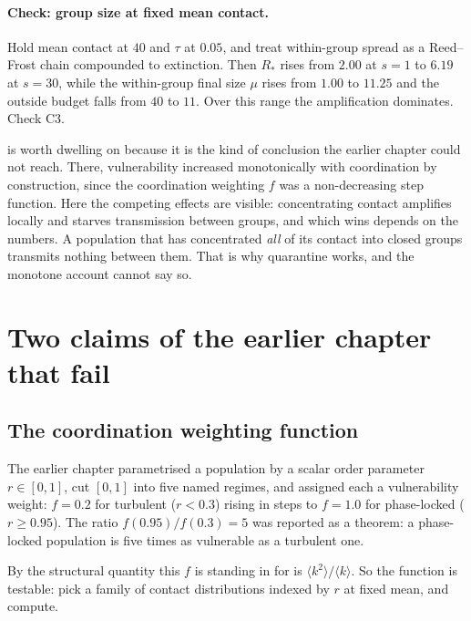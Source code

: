 \paragraph{Check: group size at fixed mean contact.} \lnkC{} Hold mean contact at
$40$ and $\tau$ at $0.05$, and treat within-group spread as a Reed--Frost
chain compounded to extinction. Then $R_*$ rises from $2.00$ at $s=1$ to
$6.19$ at $s=30$, while the within-group final size $\mu$ rises from $1.00$
to $11.25$ and the outside budget falls from $40$ to $11$. Over this range
the amplification dominates. Check C3.

 is worth dwelling on because it is the kind of
conclusion the earlier chapter could not reach. There, vulnerability
increased monotonically with coordination by construction, since the
coordination weighting $f$ was a non-decreasing step function. Here the
competing effects are visible: concentrating contact amplifies locally and
starves transmission between groups, and which wins depends on the numbers.
A population that has concentrated \emph{all} of its contact into closed
groups transmits nothing between them. That is why quarantine works, and the
monotone account cannot say so.

\section{Two claims of the earlier chapter that fail}
\label{sm:sec:failures}

\subsection{The coordination weighting function}
\label{sm:sec:weighting}

The earlier chapter parametrised a population by a scalar order parameter
$r\in[0,1]$, cut $[0,1]$ into five named regimes, and assigned each a
vulnerability weight: $f=0.2$ for turbulent ($r<0.3$) rising in steps to
$f=1.0$ for phase-locked ($r\ge0.95$). The ratio $f(0.95)/f(0.3)=5$ was
reported as a theorem: a phase-locked population is five times as vulnerable
as a turbulent one.

By  the structural quantity this $f$ is standing in for is
$\langle k^2\rangle/\langle k\rangle$. So the function is testable: pick a
family of contact distributions indexed by $r$ at fixed mean, and compute.

